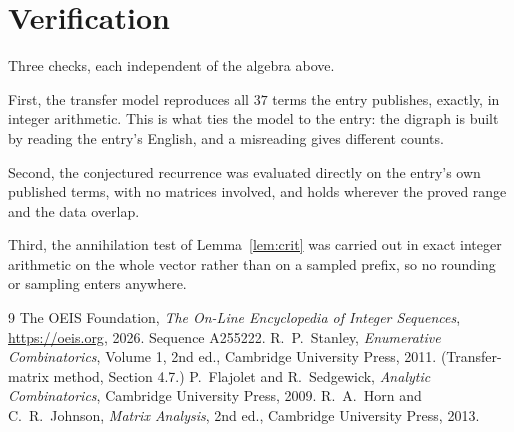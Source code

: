 \documentclass[11pt,a4paper]{article}
\theoremstyle{plain}
\theoremstyle{definition}
\begin{document}
\section{Verification}

Three checks, each independent of the algebra above.

First, the transfer model reproduces all $37$ terms the entry publishes, exactly, in
integer arithmetic. This is what ties the model to the entry: the digraph is built by reading
the entry's English, and a misreading gives different counts.

Second, the conjectured recurrence was evaluated directly on the entry's own published terms,
with no matrices involved, and holds wherever the proved range and the data overlap.

Third, the annihilation test of Lemma~\ref{lem:crit} was carried out in exact integer
arithmetic on the whole vector rather than on a sampled prefix, so no rounding or sampling
enters anywhere.

\begin{thebibliography}{9}
 The OEIS Foundation, \emph{The On-Line Encyclopedia of Integer
Sequences}, \url{https://oeis.org}, 2026. Sequence A255222.
 R.~P.~Stanley, \emph{Enumerative Combinatorics}, Volume 1, 2nd ed.,
Cambridge University Press, 2011. (Transfer-matrix method, Section 4.7.)
 P.~Flajolet and R.~Sedgewick, \emph{Analytic Combinatorics}, Cambridge
University Press, 2009.
 R.~A.~Horn and C.~R.~Johnson, \emph{Matrix Analysis}, 2nd ed., Cambridge
University Press, 2013.
\end{thebibliography}
\end{document}
